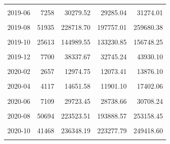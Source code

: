\begin{longtable}[t]{crrrr}
\cellcolor{gray!10}{2019-05} & \cellcolor{gray!10}{2963} & \cellcolor{gray!10}{12675.02} & \cellcolor{gray!10}{11367.56} & \cellcolor{gray!10}{13982.48}\\
2019-06 & 7258 & 30279.52 & 29285.04 & 31274.01\\
\cellcolor{gray!10}{2019-07} & \cellcolor{gray!10}{13394} & \cellcolor{gray!10}{55488.21} & \cellcolor{gray!10}{46515.77} & \cellcolor{gray!10}{64460.65}\\
2019-08 & 51935 & 228718.70 & 197757.01 & 259680.38\\
\cellcolor{gray!10}{2019-09} & \cellcolor{gray!10}{53234} & \cellcolor{gray!10}{269204.67} & \cellcolor{gray!10}{256139.41} & \cellcolor{gray!10}{282269.93}\\
2019-10 & 25613 & 144989.55 & 133230.85 & 156748.25\\
\cellcolor{gray!10}{2019-11} & \cellcolor{gray!10}{20585} & \cellcolor{gray!10}{98041.21} & \cellcolor{gray!10}{87625.33} & \cellcolor{gray!10}{108457.09}\\
2019-12 & 7700 & 38337.67 & 32745.24 & 43930.10\\
\cellcolor{gray!10}{2020-01} & \cellcolor{gray!10}{2866} & \cellcolor{gray!10}{15486.55} & \cellcolor{gray!10}{13047.48} & \cellcolor{gray!10}{17925.61}\\
2020-02 & 2657 & 12974.75 & 12073.41 & 13876.10\\
\cellcolor{gray!10}{2020-03} & \cellcolor{gray!10}{3880} & \cellcolor{gray!10}{15092.32} & \cellcolor{gray!10}{13608.87} & \cellcolor{gray!10}{16575.77}\\
2020-04 & 4117 & 14651.58 & 11901.10 & 17402.06\\
\cellcolor{gray!10}{2020-05} & \cellcolor{gray!10}{4002} & \cellcolor{gray!10}{16180.59} & \cellcolor{gray!10}{15140.14} & \cellcolor{gray!10}{17221.05}\\
2020-06 & 7109 & 29723.45 & 28738.66 & 30708.24\\
\cellcolor{gray!10}{2020-07} & \cellcolor{gray!10}{15804} & \cellcolor{gray!10}{59858.11} & \cellcolor{gray!10}{50254.70} & \cellcolor{gray!10}{69461.52}\\
2020-08 & 50694 & 223523.51 & 193888.57 & 253158.45\\
\cellcolor{gray!10}{2020-09} & \cellcolor{gray!10}{69329} & \cellcolor{gray!10}{339586.66} & \cellcolor{gray!10}{320633.92} & \cellcolor{gray!10}{358539.39}\\
2020-10 & 41468 & 236348.19 & 223277.79 & 249418.60\\
\cellcolor{gray!10}{2020-11} & \cellcolor{gray!10}{13463} & \cellcolor{gray!10}{65879.63} & \cellcolor{gray!10}{51932.23} & \cellcolor{gray!10}{79827.04}\\

\end{longtable}

